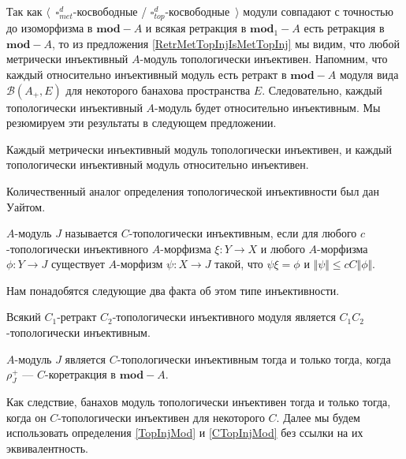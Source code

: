 Так как $\langle$~$\square_{met}^d$-косвободные / $\square_{top}^d$-косвободные~$\rangle$ модули совпадают с точностью до изоморфизма в $\mathbf{mod}-A$ и всякая ретракция в $\mathbf{mod}_1-A$ есть ретракция в $\mathbf{mod}-A$, то из предложения \ref{RetrMetTopInjIsMetTopInj} мы видим, что любой метрически инъективный $A$-модуль топологически инъективен. Напомним, что каждый относительно инъективный модуль есть ретракт в $\mathbf{mod}-A$ модуля вида $\mathcal{B}(A_+,E)$ для некоторого банахова пространства $E$. Следовательно, каждый топологически инъективный $A$-модуль будет относительно инъективным. Мы резюмируем эти результаты в следующем предложении.

\begin{proposition}\label{MetInjIsTopInjAndTopInjIsRelInj} Каждый метрически инъективный модуль топологически инъективен, и каждый топологически инъективный модуль относительно инъективен.
\end{proposition}

Количественный аналог определения топологической инъективности был дан Уайтом.

\begin{definition}\label{CTopInjMod} $A$-модуль $J$ называется $C$-топологически инъективным, если для любого $c$-топологически инъективного $A$-морфизма $\xi:Y\to X$ и любого $A$-морфизма $\phi:Y\to J$ существует $A$-морфизм $\psi:X\to J$ такой, что $\psi\xi=\phi$ и $\Vert\psi\Vert\leq cC\Vert\phi\Vert$.
\end{definition}

Нам понадобятся следующие два факта об этом типе инъективности.

\begin{proposition}\label{RetrCTopInjIsCTopInj} Всякий $C_1$-ретракт $C_2$-топологически инъективного модуля является $C_1C_2$-топологически инъективным.
\end{proposition}

\begin{proposition}\label{CTopInjModViaCanonicMorph} $A$-модуль $J$ является $C$-топологически инъективным тогда и только тогда, когда $\rho_J^+$ --- $C$-коретракция в $\mathbf{mod}-A$.
\end{proposition}

Как следствие, банахов модуль топологически инъективен тогда и только тогда, когда он $C$-топологически инъективен для некоторого $C$. Далее мы будем использовать определения \ref{TopInjMod} и \ref{CTopInjMod} без ссылки на их эквивалентность.

